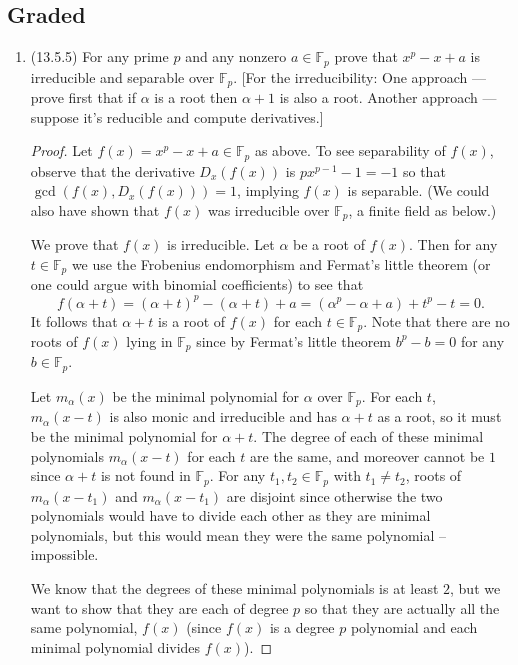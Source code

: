 \documentclass[11pt]{article}
\begin{document}
\subsection*{Graded}
\begin{enumerate}
    \item (13.5.5) For any prime $p$ and any nonzero $a\in \mathbb{F}_p$ prove that $x^p-x+a$ is irreducible and separable over $\mathbb{F}_p$. [For the irreducibility: One approach --- prove first that if $\alpha$ is a root then $\alpha+1$ is also a root. Another approach --- suppose it's reducible and compute derivatives.] \begin{proof}
        Let $f(x) = x^p-x+a\in \mathbb{F}_p$ as above. To see separability of $f(x)$, observe that the derivative $D_x(f(x))$ is $px^{p-1} - 1 = -1$ so that $\gcd(f(x), D_x(f(x))) = 1$, implying $f(x)$ is separable. (We could also have shown that $f(x)$ was irreducible over $\mathbb{F}_p$, a finite field as below.)
        
        We prove that $f(x)$ is irreducible. Let $\alpha$ be a root of $f(x)$. Then for any $t\in \mathbb{F}_p$ we use the Frobenius endomorphism and Fermat's little theorem (or one could argue with binomial coefficients) to see that \[f(\alpha+t) = (\alpha+t)^p - (\alpha + t) + a = (\alpha^p - \alpha + a) + t^p - t = 0.\] It follows that $\alpha + t$ is a root of $f(x)$ for each $t\in \mathbb{F}_p$. Note that there are no roots of $f(x)$ lying in $\mathbb{F}_p$ since by Fermat's little theorem $b^p - b = 0$ for any $b\in\mathbb{F}_p$.

        Let $m_\alpha(x)$ be the minimal polynomial for $\alpha$ over $\mathbb{F}_p$. For each $t$, $m_\alpha(x-t)$ is also monic and irreducible and has $\alpha+t$ as a root, so it must be the minimal polynomial for $\alpha+t$. The degree of each of these minimal polynomials $m_\alpha(x-t)$ for each $t$ are the same, and moreover cannot be $1$ since $\alpha+t$ is not found in $\mathbb{F}_p$. For any $t_1,t_2\in \mathbb{F}_p$ with $t_1\neq t_2$, roots of $m_\alpha(x-t_1)$ and $m_\alpha(x-t_1)$ are disjoint since otherwise the two polynomials would have to divide each other as they are minimal polynomials, but this would mean they were the same polynomial -- impossible.

        We know that the degrees of these minimal polynomials is at least $2$, but we want to show that they are each of degree $p$ so that they are actually all the same polynomial, $f(x)$ (since $f(x)$ is a degree $p$ polynomial and each minimal polynomial divides $f(x)$).


\end{proof}
\end{enumerate}
\end{document}
